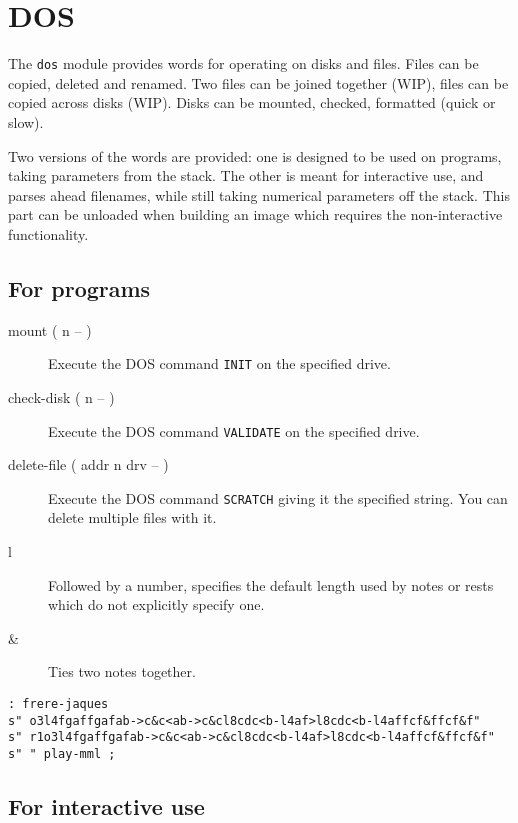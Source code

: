 \chapter{DOS}

The \texttt{dos} module provides words for operating on disks and files. Files can be copied, deleted and renamed. Two files can be joined together (WIP), files can be copied across disks (WIP). Disks can be mounted, checked, formatted (quick or slow).

Two versions of the words are provided: one is designed to be used on
programs, taking parameters from the stack. The other is meant for
interactive use, and parses ahead filenames, while still taking
numerical parameters off the stack. This part can be unloaded when
building an image which requires the non-interactive functionality.

\section{For programs}

\begin{description}
\item[mount ( n -- )] Execute the DOS command \texttt{INIT} on the specified drive.
\item[check-disk ( n -- )] Execute the DOS command \texttt{VALIDATE} on the specified drive.
\item[delete-file ( addr n drv -- )] Execute the DOS command \texttt{SCRATCH} giving it the specified string. You can delete multiple files with it.
\item[l] Followed by a number, specifies the default length used by notes or rests which do not explicitly specify one.
\item[\&] Ties two notes together.
\end{description}

\begin{verbatim}
: frere-jaques
s" o3l4fgaffgafab->c&c<ab->c&cl8cdc<b-l4af>l8cdc<b-l4affcf&ffcf&f"
s" r1o3l4fgaffgafab->c&c<ab->c&cl8cdc<b-l4af>l8cdc<b-l4affcf&ffcf&f"
s" " play-mml ;
\end{verbatim}

\section{For interactive use}

